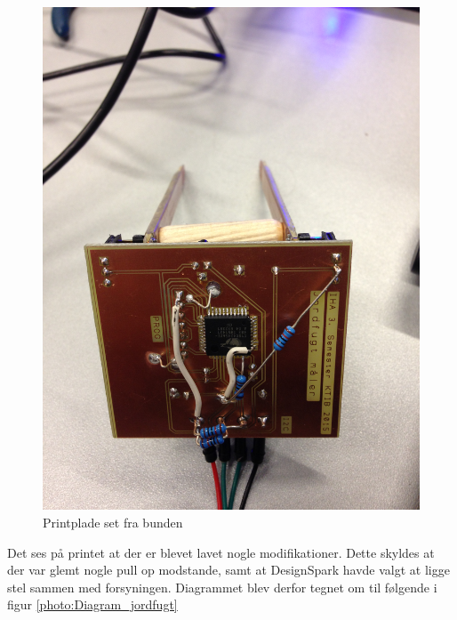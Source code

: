 \begin{figure}[H]
	\centering 
	\includegraphics[scale=0.1]{HardwareArkitektur/Sensore/Jordfugt_billeder/Print_2.jpg}
	\caption{Printplade set fra bunden}
	\label{photo:Print_2}
\end{figure} 


Det ses på printet at der er blevet lavet nogle modifikationer. Dette skyldes at der var glemt nogle pull op modstande, samt at DesignSpark havde valgt at ligge stel sammen med forsyningen. 
Diagrammet blev derfor tegnet om til følgende i figur \ref{photo:Diagram_jordfugt} 

